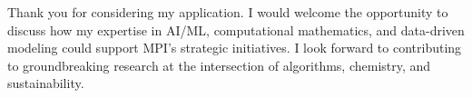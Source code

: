\documentclass[11pt,a4paper, final]{moderncv}
\begin{document}
Thank you for considering my application. I would welcome the opportunity to discuss how my expertise in AI/ML, computational mathematics, 
and data-driven modeling could support MPI's strategic initiatives. 
I look forward to contributing to groundbreaking research at the intersection of algorithms, chemistry, and sustainability.

\makeletterclosing
\end{document}
